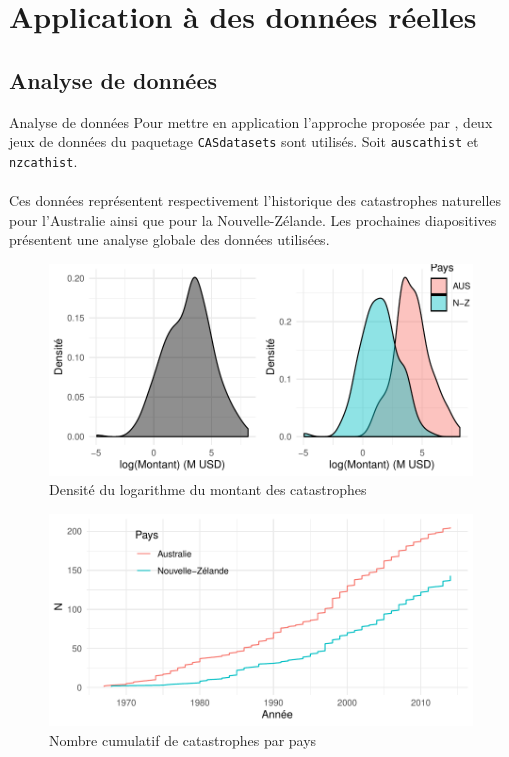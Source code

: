 

\section{Application à des données réelles}

\subsection{Analyse de données}



\begin{frame}{Analyse de données}
Pour mettre en application l'approche proposée par \cite{chavez2016extreme}, deux jeux de données du paquetage \texttt{CASdatasets} sont utilisés. Soit \texttt{auscathist} et \texttt{nzcathist}. \\~\\

Ces données représentent respectivement l'historique des catastrophes naturelles pour l'Australie ainsi que pour la Nouvelle-Zélande. Les prochaines diapositives présentent une analyse globale des données utilisées.
\end{frame}


\begin{frame}
\begin{figure}
\includegraphics[width=.8\textwidth]{images/fig-005.pdf}
\caption{Densité du logarithme du montant des catastrophes}
\end{figure}
\end{frame}

\begin{frame}
\begin{figure}
\includegraphics[width=.8\textwidth]{images/fig-006.pdf}
\caption{Nombre cumulatif de catastrophes par pays}
\end{figure}
\end{frame}

